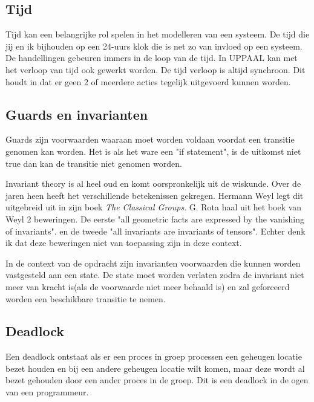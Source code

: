 \documentclass{article}%
\begin{document}




\subsection{Tijd}
Tijd kan een belangrijke rol spelen in het modelleren van een systeem. De tijd die jij en ik bijhouden op een 24-uurs klok die is net zo van invloed op een systeem. De handellingen gebeuren immers in de loop van de tijd.
In UPPAAL kan met het verloop van tijd ook gewerkt worden. De tijd verloop is altijd synchroon. Dit houdt in dat er geen 2 of meerdere acties tegelijk uitgevoerd kunnen worden.







\subsection{Guards en invarianten}
Guards zijn voorwaarden waaraan moet worden voldaan voordat een transitie genomen kan worden. Het is als het ware een "if statement", is de uitkomst niet true dan kan de transitie niet genomen worden.

Invariant theory is al heel oud en komt oorspronkelijk uit de wiskunde. Over de jaren heen heeft het verschillende betekenissen gekregen. Hermann Weyl legt dit uitgebreid uit in zijn boek \textit{The Classical Groups}. \cite{classicalgroups} G. Rota haal uit het boek van Weyl 2 beweringen. De eerste "all geometric facts are expressed by the vanishing of invariants". en de tweede "all invariants are invariants of tensors". Echter denk ik dat deze beweringen niet van toepassing zijn in deze context.

In de context van de opdracht zijn invarianten voorwaarden die kunnen worden vastgesteld aan een state. De state moet worden verlaten zodra de invariant niet meer van kracht is(als de voorwaarde niet meer behaald is) en zal geforceerd worden een beschikbare transitie te nemen.

\subsection{Deadlock}
Een deadlock ontstaat als er een proces in groep processen een geheugen locatie bezet houden en bij een andere geheugen locatie wilt komen, maar deze wordt al bezet gehouden door een ander proces in de groep. Dit is een deadlock in de ogen van een programmeur.\cite{deadlockproblem}
\end{document}
